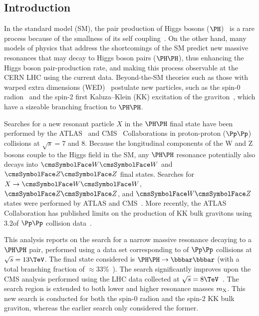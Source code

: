 \subsection{Introduction\label{sec:Introduction}}

In the standard model (SM), the pair production of Higgs bosons ($\PH$)~\cite{Chatrchyan:2012ufa,HiggsdiscoveryAtlas} is a rare process because of the smallness of its self coupling~\cite{PhysRevLett.111.201801}. 
On the other hand, many models of physics that address the shortcomings of the SM predict new massive resonances that may decay to Higgs boson pairs ($\PH\PH$), thus enhancing the Higgs boson pair-production rate, and making this process observable at the CERN LHC using the current data. 
Beyond-the-SM theories such as those with warped extra dimensions (WED)~\cite{Randall:1999ee} postulate new particles, such as the spin-0 radion~\cite{Goldberger:1999uk,DeWolfe:1999cp,Csaki:1999mp} and the spin-2 first Kaluza--Klein (KK) excitation of the graviton~\cite{Davoudiasl:1999jd,Csaki:2000zn, Agashe:2007zd}, which have a sizeable branching fraction to $\PH\PH$. 

Searches for a new resonant particle $X$ in the $\PH\PH$ final state have been performed by the
ATLAS~\cite{Aad:2014yja, Aad:2015uka, Aad:2015xja} and
CMS~\cite{Khachatryan:2014jya, Khachatryan:2015year,
  Khachatryan:2015tha,Khachatryan:2016sey} Collaborations in proton-proton ($\Pp\Pp$) collisions at
$\sqrt{s} = $7 and 8\TeV.  
Because the longitudinal components of the W and Z bosons couple to the Higgs field in the SM, 
any $\PH\PH$ resonance potentially also decays into $\PW\PW$ and $\PZ\PZ$ final states.
Searches for $X \to \PW\PW$, $\PZ\PZ$, and $\PW\PZ$ states were
performed by ATLAS and CMS~\cite{ATLASVV, ATLASWV, ATLASZV, Khachatryan:2014hpa, CMSZVWV}. 
More recently, the ATLAS Collaboration has published limits on the production of KK bulk gravitons using 3.2\fbinv of $\Pp\Pp$ collision data~\cite{Aaboud:2016xco}.

This analysis reports on the search for a narrow massive resonance decaying to a $\PH\PH$ pair, performed using a data set corresponding to \intLumi of $\Pp\Pp$ collisions at $\sqrt{s} = 13\TeV$. 
The final state considered is $\PH\PH \to \bbbar\bbbar$  (with a total branching fraction of $\approx$33\%~\cite{LHCHXSecWG}). 
The search significantly improves upon the CMS analysis performed using the LHC data collected at $\sqrt{s} = 8\TeV$~\cite{Khachatryan:2016cfa}. 
The search region is extended to both lower and higher resonance masses $m_{\text{X}}$.
This new search is conducted for both the spin-0 radion and the spin-2 KK bulk graviton, whereas the earlier search only considered the former. 

